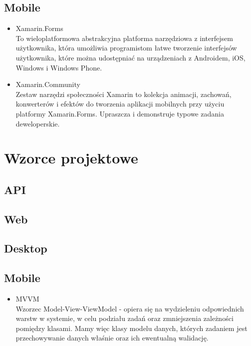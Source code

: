 \documentclass{article}
\begin{document}
    \subsection{Mobile}
     \begin{itemize}
            \item Xamarin.Forms\\
             To wieloplatformowa abstrakcyjna platforma narzędziowa z interfejsem użytkownika, która umożliwia programistom łatwe tworzenie interfejsów użytkownika, które można udostępniać na urządzeniach z Androidem, iOS, Windows i Windows Phone.
            \item Xamarin.Community\\
            Zestaw narzędzi społeczności Xamarin to kolekcja animacji, zachowań, konwerterów i efektów do tworzenia aplikacji mobilnych przy użyciu platformy Xamarin.Forms. Upraszcza i demonstruje typowe zadania deweloperskie.
             \end{itemize}


\section{Wzorce projektowe}
    \subsection{API}
       
        
    \subsection{Web}
        
        
    \subsection{Desktop}
    
    \subsection{Mobile}
    \begin{itemize}
           \item MVVM\\
             Wzorzec Model-View-ViewModel - opiera się na wydzieleniu odpowiednich warstw w systemie, w celu podziału zadań oraz zmniejszenia zależności pomiędzy klasami. Mamy więc klasy modelu danych, których zadaniem jest przechowywanie danych właśnie oraz ich ewentualną walidację.
             \end{itemize}
\end{document}
